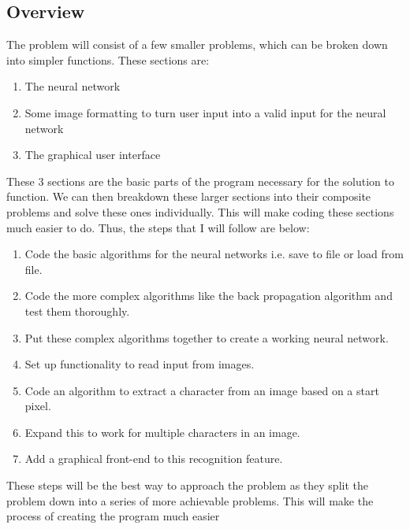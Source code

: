 \documentclass{report}
\begin{document}
\subsection{Overview}
The problem will consist of a few smaller problems, which can be broken down into simpler functions. These sections are:
\begin{enumerate}
    \item The neural network
    \item Some image formatting to turn user input into a valid input for the neural network
    \item The graphical user interface
\end{enumerate}
These 3 sections are the basic parts of the program necessary for the solution to function. We can then breakdown these larger sections into their composite problems and solve these ones individually. This will make coding these sections much easier to do. Thus, the steps that I will follow are below:
\begin{enumerate}
    \item Code the basic algorithms for the neural networks i.e. save to file or load from file.
    \item Code the more complex algorithms like the back propagation algorithm and test them thoroughly.
    \item Put these complex algorithms together to create a working neural network.
    \item Set up functionality to read input from images.
    \item Code an algorithm to extract a character from an image based on a start pixel.
    \item Expand this to work for multiple characters in an image.
    \item Add a graphical front-end to this recognition feature.
\end{enumerate}
These steps will be the best way to approach the problem as they split the problem down into a series of more achievable problems. This will make the process of creating the program much easier
\end{document}
